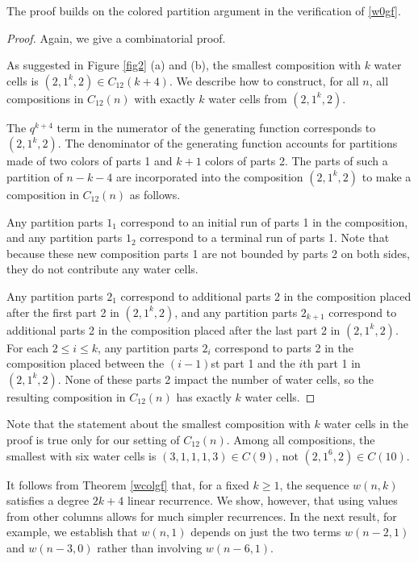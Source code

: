 \documentclass[]{interact}
\theoremstyle{plain}
\numberwithin{equation}{section} %
\numberwithin{table}{section} %
\numberwithin{figure}{section}
\begin{document}
The proof builds on the colored partition argument in the verification of \eqref{w0gf}. 

\begin{proof}
Again, we give a combinatorial proof.

As suggested in Figure \ref{fig2} (a) and (b), the smallest composition with $k$ water cells is $(2,1^k, 2) \in C_{12}(k+4)$.  We describe how to construct, for all $n$, all compositions in $C_{12}(n)$ with exactly $k$ water cells from $(2,1^k, 2)$.

The $q^{k+4}$ term in the numerator of the generating function corresponds to $(2,1^k, 2)$. The denominator of the generating function accounts for partitions made of two colors of parts 1 and $k+1$ colors of parts 2.  The parts of such a partition of $n-k-4$ are incorporated into the composition $(2,1^k, 2)$ to make a composition in $C_{12}(n)$ as follows.  

Any partition parts $1_1$ correspond to an initial run of parts 1 in the composition, and any partition parts $1_2$ correspond to a terminal run of parts 1.  Note that because these new composition parts 1 are not bounded by parts 2 on both sides, they do not contribute any water cells.  

Any partition parts $2_1$ correspond to additional parts 2 in the composition placed after the first part 2 in $(2,1^k, 2)$, and any partition parts $2_{k+1}$ correspond to additional parts 2 in the composition placed after the last part 2 in $(2,1^k, 2)$.  For each $2 \le i \le k$, any partition parts $2_i$ correspond to parts 2 in the composition placed between the $(i-1)$st part 1 and the $i$th part 1 in $(2,1^k, 2)$.  None of these parts 2 impact the number of water cells, so the resulting composition in $C_{12}(n)$ has exactly $k$ water cells.
\end{proof}

Note that the statement about the smallest composition with $k$ water cells in the proof is true only for our setting of $C_{12}(n)$.  Among all compositions, the smallest with six water cells is $(3,1,1,1,3) \in C(9)$, not $(2,1^6,2) \in C(10)$.

It follows from Theorem \ref{wcolgf} that, for a fixed $k \ge 1$, the sequence $w(n,k)$ satisfies a degree $2k+4$ linear recurrence.  We show, however, that using values from other columns allows for much simpler recurrences.  In the next result, for example, we establish that $w(n,1)$ depends on just the two terms $w(n-2,1)$ and $w(n-3,0)$ rather than involving $w(n-6,1)$.
\end{document}
